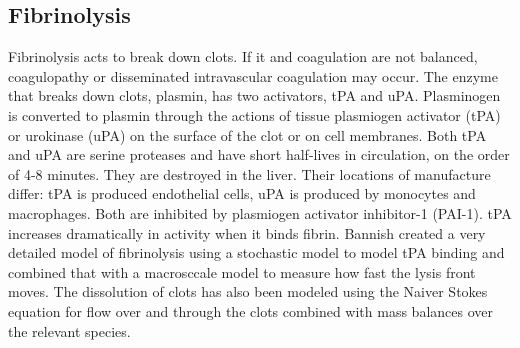 \documentclass[12pt]{article}
\begin{document}
\subsection*{Fibrinolysis}
Fibrinolysis acts to break down clots. If it and coagulation are not balanced, coagulopathy or disseminated intravascular coagulation may occur. The enzyme that breaks down clots, plasmin, has two activators, tPA and uPA. \cite{wiman1978molecular} Plasminogen is converted to plasmin through the actions of tissue plasmiogen activator (tPA) or urokinase (uPA) on the surface of the clot or on cell membranes. \citep{chapin2015fibrinolysis} Both tPA and uPA are serine proteases and have short half-lives in circulation, on the order of 4-8 minutes. They are destroyed in the liver. Their locations of manufacture differ: tPA is produced endothelial cells, uPA is produced by monocytes and macrophages. Both are inhibited by plasmiogen activator inhibitor-1 (PAI-1). tPA increases dramatically in activity when it binds fibrin. \citep{chapin2015fibrinolysis}
Bannish created a very detailed model of fibrinolysis using a stochastic model to model tPA binding and combined that with a macrosccale model to measure how fast the lysis front moves. \cite{bannish2012modelling} The dissolution of clots has also been modeled using the Naiver Stokes equation for flow over and through the clots combined with mass balances over the relevant species.\cite{wootton2002experimental} 
\end{document}

